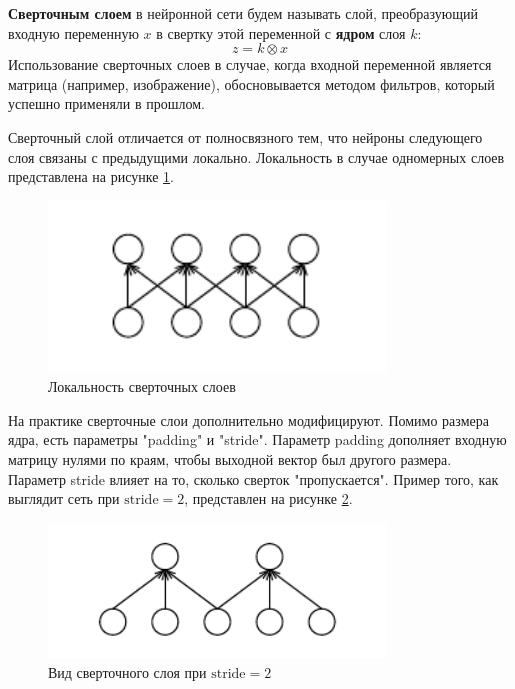\textbf{Сверточным слоем} в нейронной сети будем называть слой, преобразующий входную переменную $x$ в свертку этой переменной с \textbf{ядром} слоя $k$:
\[
    z = k \otimes x
\]
Использование сверточных слоев в случае, когда входной переменной является матрица (например, изображение), обосновывается методом фильтров, который успешно применяли в прошлом.

Сверточный слой отличается от полносвязного тем, что нейроны следующего слоя связаны с предыдущими локально.
Локальность в случае одномерных слоев представлена на рисунке \ref{fig:conv}.

\begin{figure}[ht]
    \centering
    \includegraphics[width=0.8\textwidth]{images/conv.pdf}
    \caption{Локальность сверточных слоев}
    \label{fig:conv}
\end{figure}

На практике сверточные слои дополнительно модифицируют.
Помимо размера ядра, есть параметры "padding" и "stride".
Параметр padding дополняет входную матрицу нулями по краям, чтобы выходной вектор был другого размера.
Параметр stride влияет на то, сколько сверток "пропускается".
Пример того, как выглядит сеть при $\text{stride} = 2$, представлен на рисунке \ref{fig:stride}.

\begin{figure}[h]
    \centering
    \includegraphics[width=0.8\textwidth]{images/stride.pdf}
    \caption{Вид сверточного слоя при $\text{stride}=2$}
    \label{fig:stride}
\end{figure}


